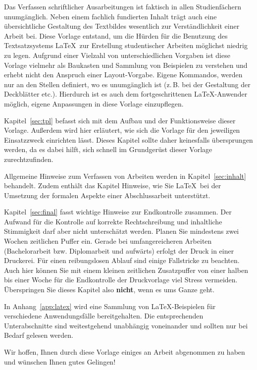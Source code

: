 Das Verfassen schriftlicher Ausarbeitungen ist faktisch in allen Studienfächern
unumgänglich. Neben einem fachlich fundierten Inhalt trägt auch eine
übersichtliche Gestaltung des Textbildes wesentlich zur Verständlichkeit einer
Arbeit bei. Diese Vorlage entstand, um die Hürden für die Benutzung des
Textsatzsystems \LaTeX\ zur Erstellung studentischer Arbeiten möglichst
niedrig zu legen. Aufgrund einer Vielzahl von unterschiedlichen Vorgaben ist
diese Vorlage vielmehr als Baukasten und Sammlung von Beispielen zu verstehen
und erhebt nicht den Anspruch einer Layout-Vorgabe. Eigene Kommandos, werden nur
an den Stellen definiert, wo es unumgänglich ist (z.\,B. bei der Gestaltung der
Deckblätter etc.). Hierdurch ist es auch dem fortgeschrittenen
\LaTeX-Anwender möglich, eigene Anpassungen in diese Vorlage einzupflegen.

Kapitel~\ref{sec:tpl} befasst sich mit dem Aufbau und der Funktionsweise dieser
Vorlage. Außerdem wird hier erläutert, wie sich die Vorlage für den jeweiligen
Einsatzzweck einrichten lässt. Dieses Kapitel sollte daher keinesfalls
übersprungen werden, da es dabei hilft, sich schnell im Grundgerüst dieser
Vorlage zurechtzufinden.

Allgemeine Hinweise zum Verfassen von Arbeiten werden in Kapitel~\ref{sec:inhalt}
behandelt. Zudem enthält das Kapitel Hinweise, wie Sie \LaTeX\ bei der
Umsetzung der formalen Aspekte einer Abschlussarbeit unterstützt.

Kapitel~\ref{sec:final} fasst wichtige Hinweise zur Endkontrolle zusammen. Der
Aufwand für die Kontrolle auf korrekte Rechtschreibung und inhaltliche
Stimmigkeit darf aber nicht unterschätzt werden. Planen Sie mindestens zwei
Wochen zeitlichen Puffer ein. Gerade bei umfangereicheren Arbeiten
(Bachelorarbeit bzw. Diplomarbeit und aufwärts) erfolgt der Druck in einer
Druckerei. Für einen reibungslosen Ablauf sind einige Fallstricke zu beachten.
Auch hier können Sie mit einem kleinen zeitlichen Zusatzpuffer von einer halben
bis einer Woche für die Endkontrolle der Druckvorlage viel Stress vermeiden.
Überspringen Sie dieses Kapitel also \textbf{nicht}, wenn es ums Ganze geht.

In Anhang~\ref{app:latex} wird eine Sammlung von \LaTeX-Beispielen für
verschiedene Anwendungsfälle bereitgehalten. Die entsprechenden Unterabschnitte
sind weitestgehend unabhängig voneinander und sollten nur bei Bedarf gelesen
werden.

Wir hoffen, Ihnen durch diese Vorlage einiges an Arbeit abgenommen zu haben und
wünschen Ihnen gutes Gelingen!

